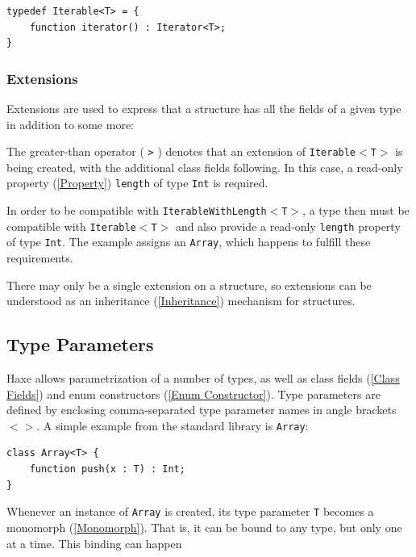 \documentclass{article}
\newcommand{\type}[1]{\texttt{#1}}
\newcommand{\expr}[1]{\texttt{#1}}
\newcommand{\tref}[2]{#1 (\ref{#2})}
\newcommand{\haxe}[2][]{%
}
\begin{document}
\begin{lstlisting}
typedef Iterable<T> = {
	function iterator() : Iterator<T>;
}
\end{lstlisting}



\subsubsection{Extensions}

Extensions are used to express that a structure has all the fields of a given type in addition to some more:

\haxe{assets/Extension.hx}
The greater-than operator ( \expr{>} ) denotes that an extension of \type{Iterable$<$T$>$} is being created, with the additional class fields following. In this case, a read-only \tref{property}{Property} \expr{length} of type \type{Int} is required.

In order to be compatible with \type{IterableWithLength$<$T$>$}, a type then must be compatible with \type{Iterable$<$T$>$} and also provide a read-only \expr{length} property of type \type{Int}. The example assigns an \type{Array}, which happens to fulfill these requirements.

There may only be a single extension on a structure, so extensions can be understood as an \tref{inheritance}{Inheritance} mechanism for structures.




\subsection{Type Parameters}
\label{Type Parameters}

Haxe allows parametrization of a number of types, as well as \tref{class fields}{Class Fields} and \tref{enum constructors}{Enum Constructor}. Type parameters are defined by enclosing comma-separated type parameter names in angle brackets \expr{$<>$}. A simple example from the standard library is \type{Array}:

\begin{lstlisting}
class Array<T> {
	function push(x : T) : Int;
}
\end{lstlisting}
Whenever an instance of \type{Array} is created, its type parameter \type{T} becomes a \tref{monomorph}{Monomorph}. That is, it can be bound to any type, but only one at a time. This binding can happen
\end{document}

